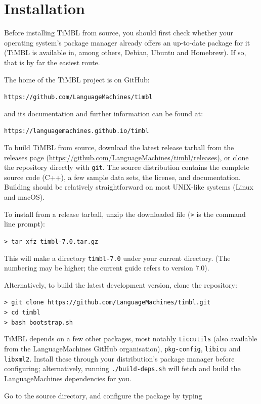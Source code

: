 \documentclass{book}
\begin{document}
\pagestyle{headings}

\chapter{Installation}
\vspace{-1cm}
Before installing TiMBL from source, you should first check whether
your operating system's package manager already offers an up-to-date
package for it (TiMBL is available in, among others, Debian, Ubuntu and
Homebrew). If so, that is by far the easiest route.

The home of the TiMBL project is on GitHub:

{\tt https://github.com/LanguageMachines/timbl}

and its documentation and further information can be found at:

{\tt https://languagemachines.github.io/timbl}

To build TiMBL from source, download the latest release tarball from
the releases page
(\url{https://github.com/LanguageMachines/timbl/releases}), or clone the
repository directly with {\tt git}. The source distribution contains the
complete source code (C++), a few sample data sets, the license, and
documentation. Building should be relatively straightforward on most
UNIX-like systems (Linux and macOS).

To install from a release tarball, unzip the downloaded file ({\tt >} is the command line prompt):

{\tt > tar xfz timbl-7.0.tar.gz}

This will make a directory {\tt timbl-7.0} under your current
directory. (The numbering may be higher; the current guide refers to
version 7.0).

Alternatively, to build the latest development version, clone the
repository:

{\tt > git clone https://github.com/LanguageMachines/timbl.git} \\
{\tt > cd timbl} \\
{\tt > bash bootstrap.sh}

TiMBL depends on a few other packages, most notably {\tt ticcutils}
(also available from the LanguageMachines GitHub organisation),
{\tt pkg-config}, {\tt libicu} and {\tt libxml2}. Install these through
your distribution's package manager before configuring; alternatively,
running {\tt ./build-deps.sh} will fetch and build the
LanguageMachines dependencies for you.

Go to the source directory, and configure the package by typing
\end{document}
